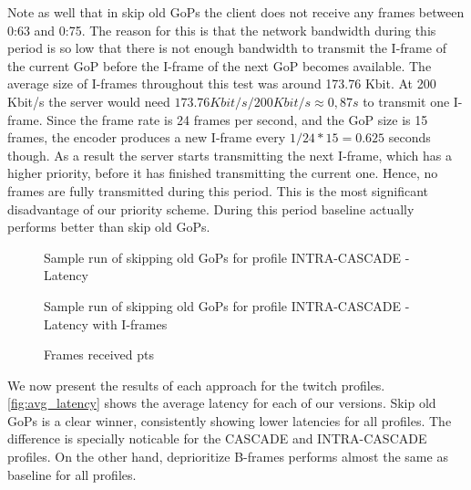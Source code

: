 Note as well that in skip old GoPs the client does not receive any frames between 0:63 and 0:75. The reason for this
is that the network bandwidth during this period is so low that there is not enough bandwidth to transmit the I-frame
of the current GoP before the I-frame of the next GoP becomes available. The average size of I-frames throughout this
test was around 173.76 Kbit. At 200 Kbit/s the server would need $173.76 Kbit/s / 200 Kbit/s \approx 0,87 s$ to transmit one I-frame. Since the frame rate is 24 frames per second, and the GoP size is 15 frames, the encoder produces a new I-frame every $1/24 * 15 = 0.625$ seconds though. As a result the server starts transmitting
the next I-frame, which has a higher priority, before it has finished transmitting the current one. Hence, no frames are fully transmitted during this period. This is the most significant disadvantage of our priority scheme. During this period baseline actually performs better than skip old GoPs.

\begin{figure}
    \centering
    
    \caption{Sample run of skipping old GoPs for profile INTRA-CASCADE - Latency}
    \label{fig:skipping_old_gops_intra_cascade:latency}
\end{figure}

\begin{figure}
    \centering
    
    \caption{Sample run of skipping old GoPs for profile INTRA-CASCADE - Latency with I-frames}
    \label{fig:skipping_old_gops_intra_cascade:latency_with_i_frames}
\end{figure}

\begin{figure}
    \centering
    
    \caption{Frames received pts}
    \label{fig:skipping_old_gops_intra_cascade:pts_received}
\end{figure}

We now present the results of each approach for the twitch profiles. \autoref{fig:avg_latency} shows the average latency for each of our versions. Skip old GoPs is a clear winner, consistently showing lower latencies for all profiles. The difference is specially noticable for the CASCADE and INTRA-CASCADE profiles. On the other hand, deprioritize B-frames performs almost the same as baseline for all profiles. %


